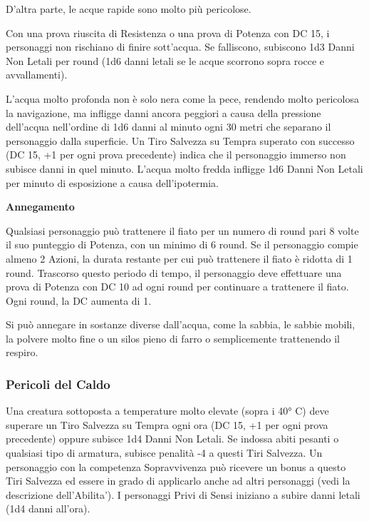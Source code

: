 \documentclass[a4paper,11pt,twoside,openany]{book}
\begin{document}
D'altra parte, le acque rapide sono molto più pericolose.

Con una prova riuscita di Resistenza o una prova di Potenza con DC 15, i personaggi non rischiano di finire sott'acqua. Se falliscono, subiscono 1d3 Danni Non Letali per round (1d6 danni letali se le acque scorrono sopra rocce e avvallamenti).

L'acqua molto profonda non è solo nera come la pece, rendendo molto pericolosa la navigazione, ma infligge danni ancora peggiori a causa della pressione dell'acqua nell'ordine di 1d6 danni al minuto ogni 30 metri che separano il personaggio dalla superficie. Un Tiro Salvezza su Tempra superato con successo (DC 15, +1 per ogni prova precedente) indica che il personaggio immerso non subisce danni in quel minuto. L'acqua molto fredda infligge 1d6 Danni Non Letali per minuto di esposizione a causa dell'ipotermia.

\textbf{Annegamento}

Qualsiasi personaggio può trattenere il fiato per un numero di round pari 8 volte il suo punteggio di Potenza, con un minimo di 6 round. Se il personaggio compie almeno 2 Azioni, la durata restante per cui può trattenere il fiato è ridotta di 1 round. Trascorso questo periodo di tempo, il personaggio deve effettuare una prova di Potenza con DC 10 ad ogni round per continuare a trattenere il fiato. Ogni round, la DC aumenta di 1.

Si può annegare in sostanze diverse dall'acqua, come la sabbia, le sabbie mobili, la polvere molto fine o un silos pieno di farro o semplicemente trattenendo il respiro.

\subsubsection{Pericoli del Caldo}

\label{pericoli-del-caldo}

Una creatura sottoposta a temperature molto elevate (sopra i 40° C) deve superare un Tiro Salvezza su Tempra ogni ora (DC 15, +1 per ogni prova precedente) oppure subisce 1d4 Danni Non Letali. Se indossa abiti pesanti o qualsiasi tipo di armatura, subisce penalità -4 a questi Tiri Salvezza. Un personaggio con la competenza Sopravvivenza può ricevere un bonus a questo Tiri Salvezza ed essere in grado di applicarlo anche ad altri personaggi (vedi la descrizione dell'Abilita'). I personaggi Privi di Sensi iniziano a subire danni letali (1d4 danni all'ora).
\end{document}
